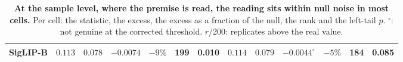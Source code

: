 \begin{table}[H]
\begin{tabular}{lcccccc|cccccc}
SigLIP-B & $0.113$ & $0.078$ & $-0.0074$ & $-9\%$ & 199 & 0.010 & $0.114$ & $0.079$ & $-0.0044^{\circ}$ & $-5\%$ & 184 & 0.085 \\
\bottomrule
\end{tabular}
\par\vspace{2pt}
\caption{\textbf{At the sample level, where the premise is read, the reading sits within null noise in most cells.} Per cell: the statistic, the excess, the excess as a fraction of the null, the rank and the left-tail $p$. $^{\circ}$: not genuine at the corrected threshold. $r$/200: replicates above the real value.
}
\label{tab:q3-sample}
\end{table}
